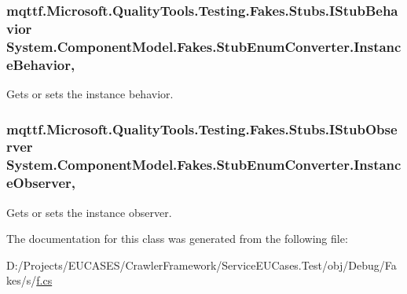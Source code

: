 \hypertarget{class_system_1_1_component_model_1_1_fakes_1_1_stub_enum_converter_a9cf7f4eb8dbd4359a05cc6087e441c3c}{
\subsubsection[{Instance\-Behavior}]{\setlength{\rightskip}{0pt plus 5cm}mqttf.\-Microsoft.\-Quality\-Tools.\-Testing.\-Fakes.\-Stubs.\-I\-Stub\-Behavior System.\-Component\-Model.\-Fakes.\-Stub\-Enum\-Converter.\-Instance\-Behavior\hspace{0.3cm}{\ttfamily [get]}, {\ttfamily [set]}}}\label{class_system_1_1_component_model_1_1_fakes_1_1_stub_enum_converter_a9cf7f4eb8dbd4359a05cc6087e441c3c}


Gets or sets the instance behavior.

\hypertarget{class_system_1_1_component_model_1_1_fakes_1_1_stub_enum_converter_af2fc02d543ef5100ac20dd1f5cfa7b8b}{
\subsubsection[{Instance\-Observer}]{\setlength{\rightskip}{0pt plus 5cm}mqttf.\-Microsoft.\-Quality\-Tools.\-Testing.\-Fakes.\-Stubs.\-I\-Stub\-Observer System.\-Component\-Model.\-Fakes.\-Stub\-Enum\-Converter.\-Instance\-Observer\hspace{0.3cm}{\ttfamily [get]}, {\ttfamily [set]}}}\label{class_system_1_1_component_model_1_1_fakes_1_1_stub_enum_converter_af2fc02d543ef5100ac20dd1f5cfa7b8b}


Gets or sets the instance observer.



The documentation for this class was generated from the following file\-:\begin{DoxyCompactItemize}
\item 
D\-:/\-Projects/\-E\-U\-C\-A\-S\-E\-S/\-Crawler\-Framework/\-Service\-E\-U\-Cases.\-Test/obj/\-Debug/\-Fakes/s/\hyperlink{s_2f_8cs}{f.\-cs}\end{DoxyCompactItemize}
